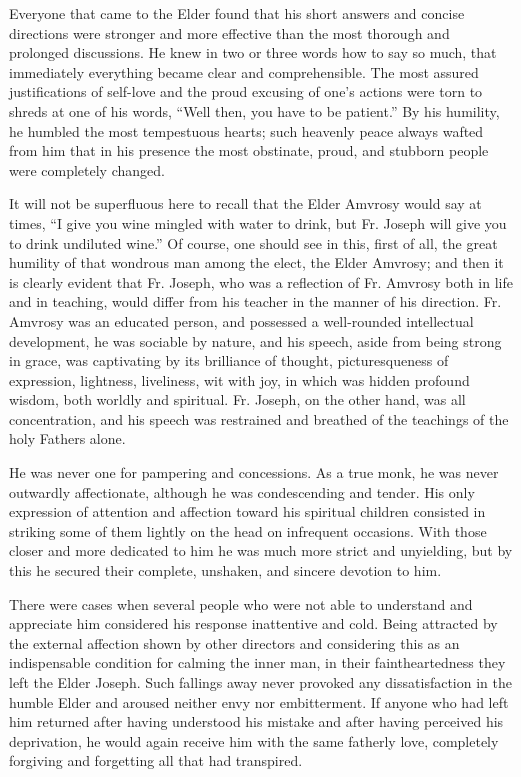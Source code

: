 Everyone that came to the Elder found that his short answers and concise directions were stronger and more effective than the most thorough and prolonged discussions. He knew in two or three words how to say so much, that immediately everything became clear and comprehensible. The most assured justifications of self-love and the proud excusing of one's actions were torn to shreds at one of his words, “Well then, you have to be patient.” By his humility, he humbled the most tempestuous hearts; such heavenly peace always wafted from him that in his presence the most obstinate, proud, and stubborn people were completely changed.

It will not be superfluous here to recall that the Elder Amvrosy would say at times, “I give you wine mingled with water to drink, but Fr. Joseph will give you to drink undiluted wine.” Of course, one should see in this, first of all, the great humility of that wondrous man among the elect, the Elder Amvrosy; and then it is clearly evident that Fr. Joseph, who was a reflection of Fr. Amvrosy both in life and in teaching, would differ from his teacher in the manner of his direction. Fr. Amvrosy was an educated person, and possessed a well-rounded intellectual development, he was sociable by nature, and his speech, aside from being strong in grace, was captivating by its brilliance of thought, picturesqueness of expression, lightness, liveliness, wit with joy, in which was hidden profound wisdom, both worldly and spiritual. Fr. Joseph, on the other hand, was all concentration, and his speech was restrained and breathed of the teachings of the holy Fathers alone.

He was never one for pampering and concessions. As a true monk, he was never outwardly affectionate, although he was condescending and tender. His only expression of attention and affection toward his spiritual children consisted in striking some of them lightly on the head on infrequent occasions. With those closer and more dedicated to him he was much more strict and unyielding, but by this he secured their complete, unshaken, and sincere devotion to him.

There were cases when several people who were not able to understand and appreciate him considered his response inattentive and cold. Being attracted by the external affection shown by other directors and considering this as an indispensable condition for calming the inner man, in their faintheartedness they left the Elder Joseph. Such fallings away never provoked any dissatisfaction in the humble Elder and aroused neither envy nor embitterment. If anyone who had left him returned after having understood his mistake and after having perceived his deprivation, he would again receive him with the same fatherly love, completely forgiving and forgetting all that had transpired.


